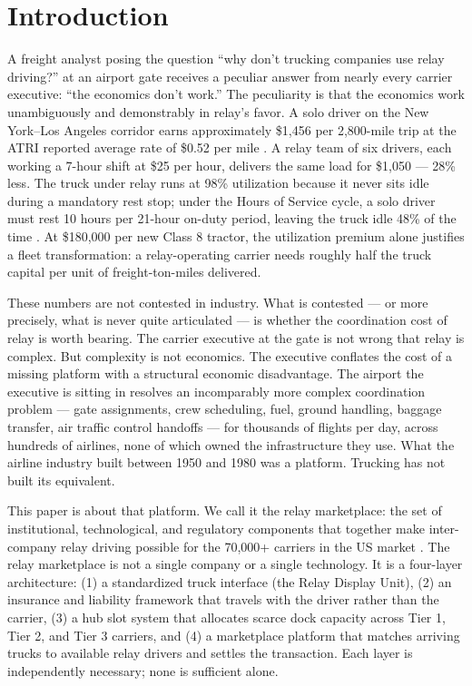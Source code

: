 \section{Introduction}
\label{sec:introduction}

A freight analyst posing the question ``why don't trucking companies use relay driving?'' at an airport gate receives a peculiar answer from nearly every carrier executive: ``the economics don't work.'' The peculiarity is that the economics work unambiguously and demonstrably in relay's favor. A solo driver on the New York--Los Angeles corridor earns approximately \$1,456 per 2,800-mile trip at the ATRI reported average rate of \$0.52 per mile \citep{ATRI_shortage2024}. A relay team of six drivers, each working a 7-hour shift at \$25 per hour, delivers the same load for \$1,050 --- 28\% less. The truck under relay runs at 98\% utilization because it never sits idle during a mandatory rest stop; under the Hours of Service cycle, a solo driver must rest 10 hours per 21-hour on-duty period, leaving the truck idle 48\% of the time \citep{FMCSA_HOS2022}. At \$180,000 per new Class 8 tractor, the utilization premium alone justifies a fleet transformation: a relay-operating carrier needs roughly half the truck capital per unit of freight-ton-miles delivered.

These numbers are not contested in industry. What is contested --- or more precisely, what is never quite articulated --- is whether the coordination cost of relay is worth bearing. The carrier executive at the gate is not wrong that relay is complex. But complexity is not economics. The executive conflates the cost of a missing platform with a structural economic disadvantage. The airport the executive is sitting in resolves an incomparably more complex coordination problem --- gate assignments, crew scheduling, fuel, ground handling, baggage transfer, air traffic control handoffs --- for thousands of flights per day, across hundreds of airlines, none of which owned the infrastructure they use. What the airline industry built between 1950 and 1980 was a platform. Trucking has not built its equivalent.

This paper is about that platform. We call it the relay marketplace: the set of institutional, technological, and regulatory components that together make inter-company relay driving possible for the 70,000+ carriers in the US market \citep{FHWA_freight2023}. The relay marketplace is not a single company or a single technology. It is a four-layer architecture: (1) a standardized truck interface (the Relay Display Unit), (2) an insurance and liability framework that travels with the driver rather than the carrier, (3) a hub slot system that allocates scarce dock capacity across Tier 1, Tier 2, and Tier 3 carriers, and (4) a marketplace platform that matches arriving trucks to available relay drivers and settles the transaction. Each layer is independently necessary; none is sufficient alone.

